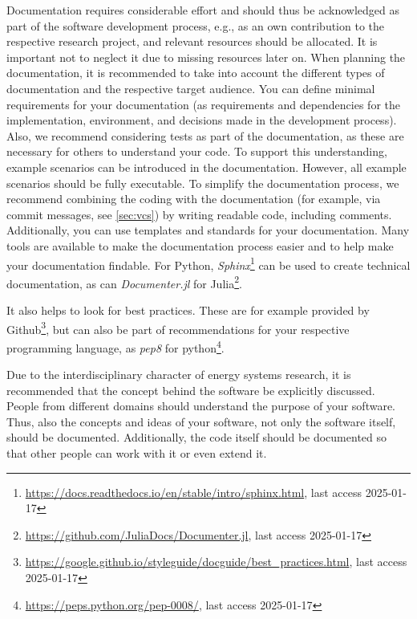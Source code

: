 Documentation requires considerable effort and should thus be acknowledged as part of the software development process, e.g., as an own contribution to the respective research project, and relevant resources should be allocated. It is important not to neglect it due to missing resources later on.
When planning the documentation, it is recommended to take into account the different types of documentation and the respective target audience. You can define minimal requirements for your documentation (as requirements and dependencies for the implementation, environment, and decisions made in the development process). Also, we recommend considering tests as part of the documentation, as these are necessary for others to understand your code. To support this understanding, example scenarios can be introduced in the documentation. However, all example scenarios should be fully executable.
To simplify the documentation process, we recommend combining the coding with the documentation (for example, via commit messages, see \ref{sec:vcs}) by writing readable code, including comments. Additionally, you can use templates and standards for your documentation. Many tools are available to make the documentation process easier and to help make your documentation findable. For Python, \textit{Sphinx}\footnote{\url{https://docs.readthedocs.io/en/stable/intro/sphinx.html}, last access 2025-01-17} can be used to create technical documentation, as can \textit{Documenter.jl} for Julia\footnote{\url{https://github.com/JuliaDocs/Documenter.jl}, last access 2025-01-17}.\par 

It also helps to look for best practices. These are for example provided by Github\footnote{\url{https://google.github.io/styleguide/docguide/best_practices.html}, last access 2025-01-17}, but can also be part of recommendations for your respective programming language, as \textit{pep8} for python\footnote{\url{https://peps.python.org/pep-0008/}, last access 2025-01-17}.

Due to the interdisciplinary character of energy systems research, it is recommended that the concept behind the software be explicitly discussed. People from different domains should understand the purpose of your software. Thus, also the concepts and ideas of your software, not only the software itself, should be documented. Additionally, the code itself should be documented so that other people can work with it or even extend it. 
